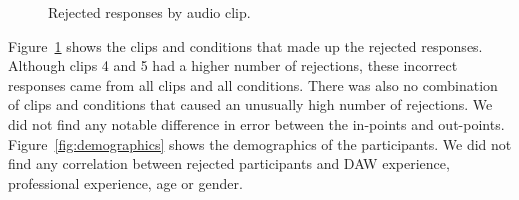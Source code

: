\begin{figure}[h]
\centering
  \caption{Rejected responses by audio clip.}
  \label{fig:rejected-clips}
\end{figure}

Figure~\ref{fig:rejected-clips} shows the clips and conditions that made up the rejected responses.  Although clips 4
and 5 had a higher number of rejections, these incorrect responses came from all clips and all conditions. There was
also no combination of clips and conditions that caused an unusually high number of rejections.  We did not find any
notable difference in error between the in-points and out-points.  Figure~\ref{fig:demographics} shows the demographics
of the participants.  We did not find any correlation between rejected participants and DAW experience, professional
experience, age or gender.

